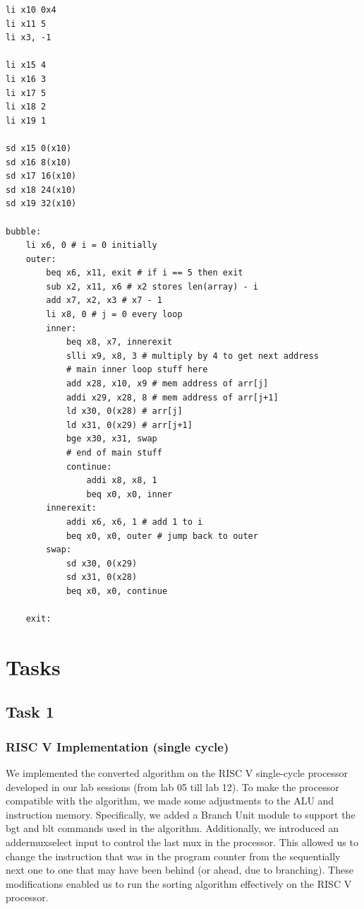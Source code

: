 \documentclass{report}
\begin{document}
\begin{verbatim}
li x10 0x4
li x11 5
li x3, -1

li x15 4
li x16 3
li x17 5
li x18 2
li x19 1

sd x15 0(x10)
sd x16 8(x10)
sd x17 16(x10)
sd x18 24(x10)
sd x19 32(x10)

bubble:
	li x6, 0 # i = 0 initially
    outer:
    	beq x6, x11, exit # if i == 5 then exit
        sub x2, x11, x6 # x2 stores len(array) - i
        add x7, x2, x3 # x7 - 1
        li x8, 0 # j = 0 every loop
        inner:
            beq x8, x7, innerexit
            slli x9, x8, 3 # multiply by 4 to get next address
            # main inner loop stuff here
            add x28, x10, x9 # mem address of arr[j]
            addi x29, x28, 8 # mem address of arr[j+1]
            ld x30, 0(x28) # arr[j]
            ld x31, 0(x29) # arr[j+1]
            bge x30, x31, swap
            # end of main stuff
            continue:
                addi x8, x8, 1
                beq x0, x0, inner
       	innerexit:
        	addi x6, x6, 1 # add 1 to i
        	beq x0, x0, outer # jump back to outer
        swap:
            sd x30, 0(x29)
            sd x31, 0(x28)
            beq x0, x0, continue

	exit:
\end{verbatim}


\chapter{Tasks}
\section{Task 1}
\subsection{RISC V Implementation (single cycle)}

    We implemented the converted algorithm on the RISC V single-cycle processor developed in our lab sessions (from lab 05 till lab 12). To make the processor compatible with the algorithm, we made some adjustments to the ALU and instruction memory. Specifically, we added a Branch Unit module to support the bgt and blt commands used in the algorithm. Additionally, we introduced an addermuxselect input to control the last mux in the processor. This allowed us to change the instruction that was in the program counter from the sequentially next one to one that may have been behind (or ahead, due to branching). These modifications enabled us to run the sorting algorithm effectively on the RISC V processor.
    
\end{document}
